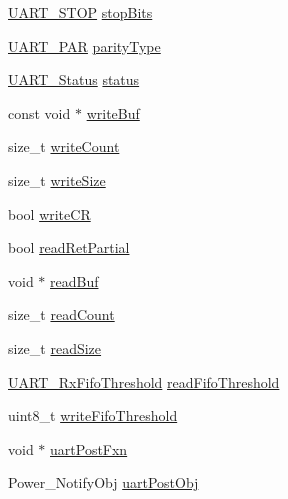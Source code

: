 \begin{DoxyCompactItemize}
\item 
\hyperlink{_u_a_r_t_8h_a176b71ca19bc13d7534fa30fc18c2243}{U\-A\-R\-T\-\_\-\-S\-T\-O\-P} \hyperlink{struct_u_a_r_t_c_c26_x_x___object_ae5a931f5b2f5de1c3aa6852856ca1b4a}{stop\-Bits}
\item 
\hyperlink{_u_a_r_t_8h_ac70b5aa75500b8c45a51ec560deccfc4}{U\-A\-R\-T\-\_\-\-P\-A\-R} \hyperlink{struct_u_a_r_t_c_c26_x_x___object_ab42ca16e6fc784e7d0a727b1e9c6b299}{parity\-Type}
\item 
\hyperlink{_u_a_r_t_c_c26_x_x_8h_a778bbef5f4b52a5651552136715f53c4}{U\-A\-R\-T\-\_\-\-Status} \hyperlink{struct_u_a_r_t_c_c26_x_x___object_a10ff4c367c40263e72d3494f78b9ce07}{status}
\item 
const void $\ast$ \hyperlink{struct_u_a_r_t_c_c26_x_x___object_a440f4f4b165c4c725e544f13ad9ed02b}{write\-Buf}
\item 
size\-\_\-t \hyperlink{struct_u_a_r_t_c_c26_x_x___object_ac1e9fe4a759db1bb57ea9e50af9b08c2}{write\-Count}
\item 
size\-\_\-t \hyperlink{struct_u_a_r_t_c_c26_x_x___object_a6532e1f4a50fcf7e6908f7502a64fea6}{write\-Size}
\item 
bool \hyperlink{struct_u_a_r_t_c_c26_x_x___object_adc03957f1fbafe66c14fd7d9308a5e71}{write\-C\-R}
\item 
bool \hyperlink{struct_u_a_r_t_c_c26_x_x___object_af8d33692f51db0e0874b0568e7011e78}{read\-Ret\-Partial}
\item 
void $\ast$ \hyperlink{struct_u_a_r_t_c_c26_x_x___object_a9672e42f229731578af8a2c81f3f84db}{read\-Buf}
\item 
size\-\_\-t \hyperlink{struct_u_a_r_t_c_c26_x_x___object_a860c348843ce491dc8787304ddc84f38}{read\-Count}
\item 
size\-\_\-t \hyperlink{struct_u_a_r_t_c_c26_x_x___object_abefd4ca2a4db441a73e8b373a6947f85}{read\-Size}
\item 
\hyperlink{_u_a_r_t_c_c26_x_x_8h_ae4d3bdbfa5106a07c6965f3fe40f8c8a}{U\-A\-R\-T\-\_\-\-Rx\-Fifo\-Threshold} \hyperlink{struct_u_a_r_t_c_c26_x_x___object_a51d3661b943fac2831684d4caa4eb7e4}{read\-Fifo\-Threshold}
\item 
uint8\-\_\-t \hyperlink{struct_u_a_r_t_c_c26_x_x___object_aad6be8e2a10e4a97ef30de3bc00f74d6}{write\-Fifo\-Threshold}
\item 
void $\ast$ \hyperlink{struct_u_a_r_t_c_c26_x_x___object_a990a1d69fb8edf1e88f47e01f7de4e5f}{uart\-Post\-Fxn}
\item 
Power\-\_\-\-Notify\-Obj \hyperlink{struct_u_a_r_t_c_c26_x_x___object_a06f854831de50d17f7249224f560cdd5}{uart\-Post\-Obj}

\end{DoxyCompactItemize}
